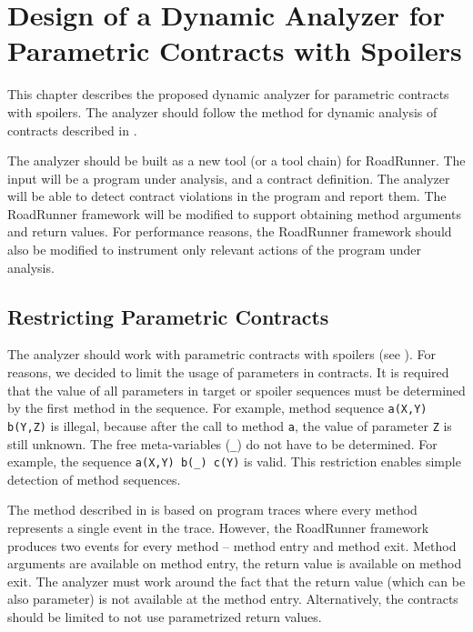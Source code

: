 \todo{}




\chapter{Design of a Dynamic Analyzer for Parametric Contracts with Spoilers}
\label{chFour}

This chapter describes the proposed dynamic analyzer for parametric contracts
with spoilers. The analyzer should follow the method for dynamic analysis of
contracts described in \cite{FITPUB11510}. 

The analyzer should be built as a new tool (or a tool chain) for RoadRunner. The
input will be a program under analysis, and a contract definition. The analyzer
will be able to detect contract violations in the program and report them. The
RoadRunner framework will be modified to support obtaining method arguments and
return values. For performance reasons, the RoadRunner framework should also be
modified to instrument only relevant actions of the program under analysis.

\section{Restricting Parametric Contracts}

The analyzer should work with parametric contracts with spoilers (see
). For  reasons, we decided to limit the usage of
parameters in contracts. It is required that the value of all parameters in
target or spoiler sequences must be determined by the first method in the
sequence. For example, method sequence \texttt{a(X,Y) b(Y,Z)} is illegal,
because after the call to method \texttt{a}, the value of parameter \texttt{Z}
is still unknown. The free meta-variables (\texttt{\_}) do not have to be
determined. For example, the sequence \texttt{a(X,Y) b(\_) c(Y)} is valid. This
restriction enables simple detection of method sequences. 

The method described in \cite{FITPUB11510} is based on program traces where
every method represents a single event in the trace. However, the RoadRunner
framework produces two events for every method -- method entry and method exit.
Method arguments are available on method entry, the return value is available on
method exit. The analyzer must work around the fact that the return value (which
can be also parameter) is not available at the method entry. Alternatively, the
contracts should be limited to not use parametrized return values.

